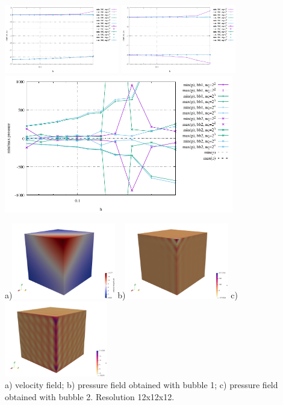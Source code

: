 \begin{center}
\includegraphics[width=5cm]{python_codes/fieldstone_75/results/burst/exz_stats.pdf}
\includegraphics[width=5cm]{python_codes/fieldstone_75/results/burst/eyz_stats.pdf}\\
\includegraphics[width=10cm]{python_codes/fieldstone_75/results/burst/p_stats.pdf}
\end{center}

\begin{center}
a)\includegraphics[width=4.5cm]{python_codes/fieldstone_75/results/burst/vel.png}
b)\includegraphics[width=4.5cm]{python_codes/fieldstone_75/results/burst/p_b1}
c)\includegraphics[width=4.5cm]{python_codes/fieldstone_75/results/burst/p_b2}\\
{\captionfont a) velocity field; b) pressure field obtained with bubble 1;
c) pressure field obtained with bubble 2. Resolution 12x12x12.}
\end{center}

